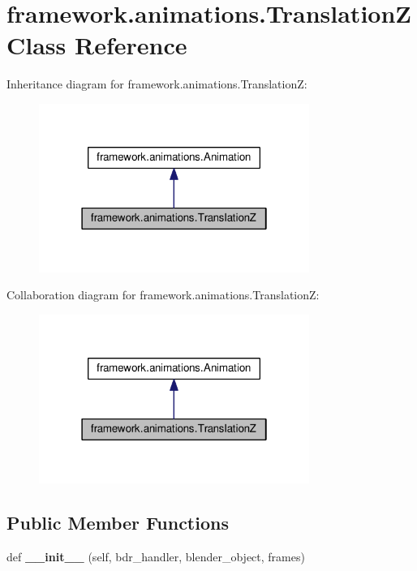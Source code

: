 \hypertarget{classframework_1_1animations_1_1TranslationZ}{}\section{framework.\+animations.\+TranslationZ Class Reference}
\label{classframework_1_1animations_1_1TranslationZ}


Inheritance diagram for framework.\+animations.\+TranslationZ\+:
\nopagebreak
\begin{figure}[H]
\begin{center}
\leavevmode
\includegraphics[width=250pt]{classframework_1_1animations_1_1TranslationZ__inherit__graph}
\end{center}
\end{figure}


Collaboration diagram for framework.\+animations.\+TranslationZ\+:
\nopagebreak
\begin{figure}[H]
\begin{center}
\leavevmode
\includegraphics[width=250pt]{classframework_1_1animations_1_1TranslationZ__coll__graph}
\end{center}
\end{figure}
\subsection*{Public Member Functions}
\begin{DoxyCompactItemize}
\item 
def {\bfseries \+\_\+\+\_\+init\+\_\+\+\_\+} (self, bdr\+\_\+handler, blender\+\_\+object, frames)\hypertarget{classframework_1_1animations_1_1TranslationZ_a2cb51ff4f2413ec338b206237ea008b8}{}\label{classframework_1_1animations_1_1TranslationZ_a2cb51ff4f2413ec338b206237ea008b8}

\end{DoxyCompactItemize}
